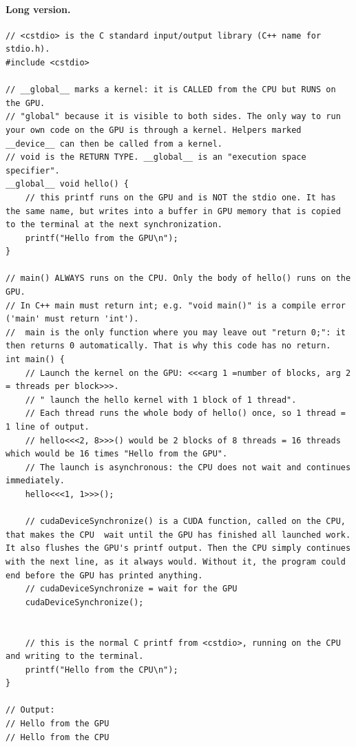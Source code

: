 \documentclass[main.tex]{subfiles}
\begin{document}
\paragraph{Long version.}
\begin{lstlisting}[language=CUDA]
// <cstdio> is the C standard input/output library (C++ name for stdio.h).
#include <cstdio>

// __global__ marks a kernel: it is CALLED from the CPU but RUNS on the GPU.
// "global" because it is visible to both sides. The only way to run your own code on the GPU is through a kernel. Helpers marked __device__ can then be called from a kernel.
// void is the RETURN TYPE. __global__ is an "execution space specifier".
__global__ void hello() {
    // this printf runs on the GPU and is NOT the stdio one. It has the same name, but writes into a buffer in GPU memory that is copied to the terminal at the next synchronization.
    printf("Hello from the GPU\n");
}

// main() ALWAYS runs on the CPU. Only the body of hello() runs on the GPU.
// In C++ main must return int; e.g. "void main()" is a compile error ('main' must return 'int').
//  main is the only function where you may leave out "return 0;": it then returns 0 automatically. That is why this code has no return.
int main() {
    // Launch the kernel on the GPU: <<<arg 1 =number of blocks, arg 2 = threads per block>>>.
    // " launch the hello kernel with 1 block of 1 thread".
    // Each thread runs the whole body of hello() once, so 1 thread = 1 line of output.
    // hello<<<2, 8>>>() would be 2 blocks of 8 threads = 16 threads which would be 16 times "Hello from the GPU".
    // The launch is asynchronous: the CPU does not wait and continues immediately.
    hello<<<1, 1>>>();

    // cudaDeviceSynchronize() is a CUDA function, called on the CPU, that makes the CPU  wait until the GPU has finished all launched work. It also flushes the GPU's printf output. Then the CPU simply continues with the next line, as it always would. Without it, the program could end before the GPU has printed anything.
    // cudaDeviceSynchronize = wait for the GPU
    cudaDeviceSynchronize();


    // this is the normal C printf from <cstdio>, running on the CPU and writing to the terminal.
    printf("Hello from the CPU\n");
}

// Output:
// Hello from the GPU
// Hello from the CPU
\end{lstlisting}
\end{document}
